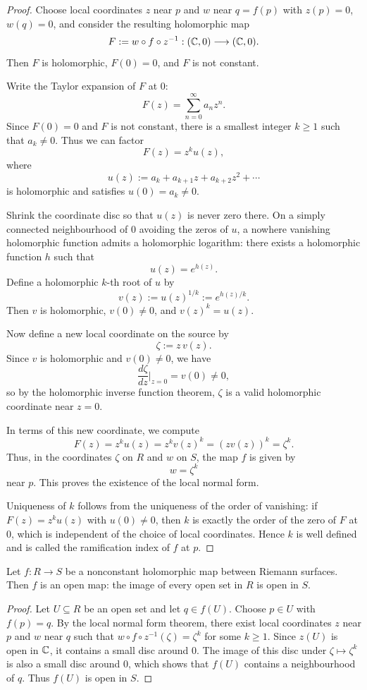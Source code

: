 \documentclass[12pt]{article}
\begin{document}
\begin{proof}
Choose local coordinates $z$ near $p$ and $w$ near $q=f(p)$ with
$z(p)=0$, $w(q)=0$, and consider the resulting holomorphic map
\[
F := w \circ f \circ z^{-1} : (\mathbb{C},0)\longrightarrow(\mathbb{C},0).
\]
Then $F$ is holomorphic, $F(0)=0$, and $F$ is not constant.

Write the Taylor expansion of $F$ at $0$:
\[
F(z) = \sum_{n=0}^\infty a_n z^n.
\]
Since $F(0)=0$ and $F$ is not constant, there is a smallest integer
$k \ge 1$ such that $a_k \neq 0$. Thus we can factor
\[
F(z) = z^k u(z),
\]
where
\[
u(z) := a_k + a_{k+1}z + a_{k+2}z^2 + \cdots
\]
is holomorphic and satisfies $u(0)=a_k\neq 0$.

Shrink the coordinate disc so that $u(z)$ is never zero there. On a
simply connected neighbourhood of $0$ avoiding the zeros of $u$, a
nowhere vanishing holomorphic function admits a holomorphic logarithm:
there exists a holomorphic function $h$ such that
\[
u(z) = e^{h(z)}.
\]
Define a holomorphic $k$-th root of $u$ by
\[
v(z) := u(z)^{1/k} := e^{h(z)/k}.
\]
Then $v$ is holomorphic, $v(0) \neq 0$, and $v(z)^k = u(z)$.

Now define a new local coordinate on the source by
\[
\zeta := z\,v(z).
\]
Since $v$ is holomorphic and $v(0)\neq 0$, we have
\[
\frac{d\zeta}{dz}\Big|_{z=0} = v(0) \neq 0,
\]
so by the holomorphic inverse function theorem, $\zeta$ is a valid
holomorphic coordinate near $z=0$.

In terms of this new coordinate, we compute
\[
F(z) = z^k u(z) = z^k v(z)^k = (z v(z))^k = \zeta^k.
\]
Thus, in the coordinates $\zeta$ on $R$ and $w$ on $S$, the map $f$ is
given by
\[
w = \zeta^k
\]
near $p$. This proves the existence of the local normal form.

Uniqueness of $k$ follows from the uniqueness of the order of vanishing:
if $F(z) = z^k u(z)$ with $u(0)\neq 0$, then $k$ is exactly the order of
the zero of $F$ at $0$, which is independent of the choice of local
coordinates. Hence $k$ is well defined and is called the ramification
index of $f$ at $p$.
\end{proof}

\begin{corollary}
Let $f : R \to S$ be a nonconstant holomorphic map between Riemann surfaces.
Then $f$ is an open map: the image of every open set in $R$ is open in $S$.
\end{corollary}
\begin{proof}
Let $U \subseteq R$ be an open set and let $q \in f(U)$. Choose $p \in U$ with $f(p)=q$. By the local normal form theorem, there exist local coordinates $z$ near $p$ and $w$ near $q$ such that $w \circ f \circ z^{-1}(\zeta) = \zeta^k$ for some $k \ge 1$. Since $z(U)$ is open in $\mathbb{C}$, it contains a small disc around $0$. The image of this disc under $\zeta \mapsto \zeta^k$ is also a small disc around $0$, which shows that $f(U)$ contains a neighbourhood of $q$. Thus $f(U)$ is open in $S$.
\end{proof}
\end{document}
